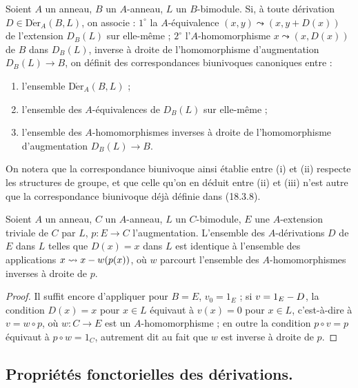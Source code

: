 \begin{corollary}[20.1.6]
\label{0.20.1.6-fr}
Soient $A$ un anneau, $B$ un $A$-anneau, $L$ un $B$-bimodule. Si, à toute
dérivation $D\in\operatorname{D\acute{e}r}_A(B,L)$, on associe : $1^\circ$ la
$A$-équivalence $(x,y)\leadsto(x,y+D(x))$ de l'extension $D_B(L)$ sur
elle-même ; $2^\circ$ l'$A$-homomorphisme $x\leadsto(x,D(x))$ de $B$ dans
$D_B(L)$, inverse à droite de l'homomorphisme d'augmentation $D_B(L)\to B$,
on définit des correspondances biunivoques canoniques entre :
\begin{enumerate}
  \item[\rm(i)] l'ensemble $\operatorname{D\acute{e}r}_A(B,L)$ ;
  \item[\rm(ii)] l'ensemble des $A$-équivalences de $D_B(L)$ sur elle-même ;
  \item[\rm(iii)] l'ensemble des $A$-homomorphismes inverses à droite de
  l'homomorphisme d'augmentation $D_B(L)\to B$.
\end{enumerate}
\end{corollary}

On notera que la correspondance biunivoque ainsi établie entre (i) et (ii)
respecte les structures de groupe, et que celle qu'on en déduit entre (ii) et
(iii) n'est autre que la correspondance biunivoque déjà définie dans (18.3.8).

\begin{corollary}[20.1.7]
\label{0.20.1.7-fr}
Soient $A$ un anneau, $C$ un $A$-anneau, $L$ un $C$-bimodule, $E$ une
$A$-extension triviale de $C$ par $L$, $p:E\to C$ l'augmentation. L'ensemble
des $A$-dérivations $D$ de $E$ dans $L$ telles que $D(x)=x$ dans $L$ est
identique à l'ensemble des applications $x\leadsto x- w(p(x))$, où $w$
parcourt l'ensemble des $A$-homomorphismes inverses à droite de $p$.
\end{corollary}

\begin{proof}
Il suffit encore d'appliquer  pour $B=E$,
$v_0=1_E$ ; si $v=1_E- D$, la condition $D(x)=x$ pour
$x\in L$ équivaut à $v(x)=0$ pour $x\in L$, c'est-à-dire à $v=w\circ p$,
où $w:C\to E$ est un $A$-homomorphisme ; en outre la condition
$p\circ v=p$ équivaut à $p\circ w=1_C$, autrement dit au fait que
$w$ est inverse à droite de $p$.
\end{proof}

\subsection{Propriétés fonctorielles des dérivations.}
\label{subsection:0.20.2-fr}

